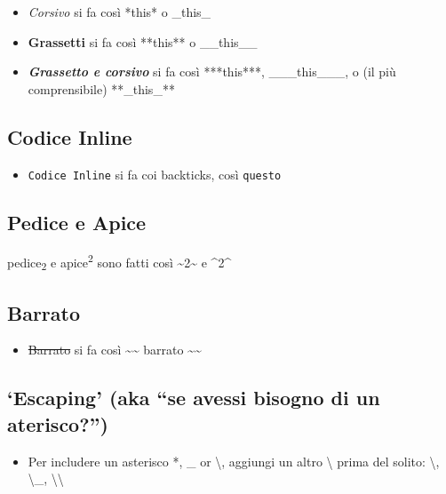 \documentclass[a4paper, 11pt, nobind]{templates/ociamthesis}
\providecommand{\tightlist}{%
  \setlength{\itemsep}{0pt}\setlength{\parskip}{0pt}}
\begin{document}
\begin{itemize}
\tightlist
\item
  \emph{Corsivo} si fa così *this* o \_this\_
\item
  \textbf{Grassetti} si fa così **this** o \_\_this\_\_
\item
  \textbf{\emph{Grassetto e corsivo}} si fa così ***this***, \_\_\_this\_\_\_, o (il più comprensibile) **\_this\_**
\end{itemize}

\hypertarget{codice-inline}{%
\subsection{Codice Inline}\label{codice-inline}}

\begin{itemize}
\tightlist
\item
  \texttt{Codice\ Inline} si fa coi backticks, così \texttt{\textasciigrave{}questo\textasciigrave{}}
\end{itemize}

\hypertarget{pedice-e-apice}{%
\subsection{Pedice e Apice}\label{pedice-e-apice}}

pedice\textsubscript{2} e apice\textsuperscript{2} sono fatti così \textasciitilde2\textasciitilde{} e \^{}2\^{}

\hypertarget{barrato}{%
\subsection{Barrato}\label{barrato}}

\begin{itemize}
\tightlist
\item
  \sout{Barrato} si fa così \textasciitilde\textasciitilde{} barrato \textasciitilde\textasciitilde{}
\end{itemize}

\hypertarget{escaping-aka-se-avessi-bisogno-di-un-aterisco}{%
\subsection{`Escaping' (aka ``se avessi bisogno di un aterisco?'')}\label{escaping-aka-se-avessi-bisogno-di-un-aterisco}}

\begin{itemize}
\tightlist
\item
  Per includere un asterisco *, \_ or \textbackslash, aggiungi un altro \textbackslash{} prima del solito: \textbackslash*, \textbackslash\_, \textbackslash\textbackslash{}
\end{itemize}
\end{document}
